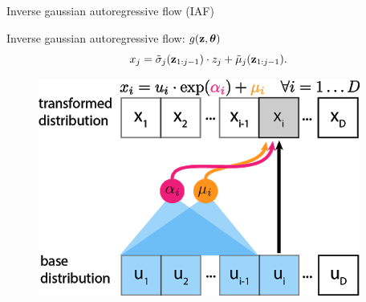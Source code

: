 \documentclass{beamer}
\begin{document}
\begin{frame}{Inverse gaussian autoregressive flow (IAF)}
	\begin{minipage}[t]{0.65\columnwidth}
		\begin{block}{Inverse gaussian autoregressive flow: $g(\mathbf{z}, \boldsymbol{\theta})$}
			\vspace{-0.3cm}
			\[
			x_j = \tilde{\sigma}_j (\mathbf{z}_{1:j-1}) \cdot z_j + \tilde{\mu}_j(\mathbf{z}_{1:j-1}).
			\]
		\end{block}
	\end{minipage}%
	\begin{minipage}[t]{0.35\columnwidth}
		\begin{figure}[h]
			\centering
			\includegraphics[width=.9\linewidth]{figs/af_iaf_explained_3.png}
		\end{figure}
	\end{minipage}
	
\end{frame}
\end{document}
